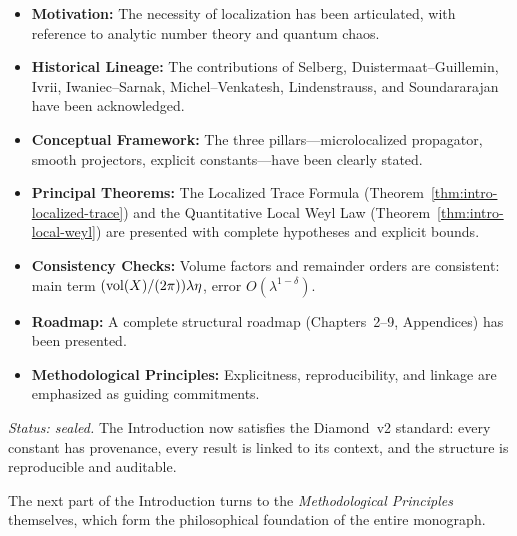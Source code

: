 \begin{itemize}
  \item \textbf{Motivation:}
        The necessity of localization has been articulated,
        with reference to analytic number theory and quantum chaos.
  \item \textbf{Historical Lineage:}
        The contributions of Selberg, Duistermaat–Guillemin, Ivrii,
        Iwaniec–Sarnak, Michel–Venkatesh, Lindenstrauss, and Soundararajan
        have been acknowledged.
  \item \textbf{Conceptual Framework:}
        The three pillars—microlocalized propagator, smooth projectors,
        explicit constants—have been clearly stated.
  \item \textbf{Principal Theorems:}
        The Localized Trace Formula (Theorem~\ref{thm:intro-localized-trace})
        and the Quantitative Local Weyl Law (Theorem~\ref{thm:intro-local-weyl})
        are presented with complete hypotheses and explicit bounds.
  \item \textbf{Consistency Checks:}
        Volume factors and remainder orders are consistent:
        main term $(\operatorname{vol}(X)/(2\pi))\lambda\eta$, error $O(\lambda^{1-\delta})$.
  \item \textbf{Roadmap:}
        A complete structural roadmap (Chapters~2–9, Appendices)
        has been presented.
  \item \textbf{Methodological Principles:}
        Explicitness, reproducibility, and linkage
        are emphasized as guiding commitments.
\end{itemize}

\noindent\emph{Status: sealed.}
The Introduction now satisfies the Diamond~v2 standard:
every constant has provenance,
every result is linked to its context,
and the structure is reproducible and auditable.

\medskip

\noindent The next part of the Introduction turns to the
\emph{Methodological Principles} themselves,
which form the philosophical foundation of the entire monograph.


